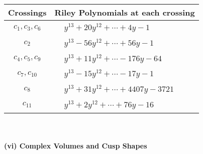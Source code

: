 \documentclass[1p]{elsarticle_modified}
\theoremstyle{definition}
\begin{document}
\begin{tabular}{m{50pt}|m{274pt}}
Crossings & \hspace{64pt}Riley Polynomials at each crossing \\
\hline $$\begin{aligned}c_{1},c_{3},c_{6}\end{aligned}$$&$\begin{aligned}
&y^{13}+20 y^{12}+\cdots+4 y-1
\end{aligned}$\\
\hline $$\begin{aligned}c_{2}\end{aligned}$$&$\begin{aligned}
&y^{13}-56 y^{12}+\cdots+56 y-1
\end{aligned}$\\
\hline $$\begin{aligned}c_{4},c_{5},c_{9}\end{aligned}$$&$\begin{aligned}
&y^{13}+11 y^{12}+\cdots-176 y-64
\end{aligned}$\\
\hline $$\begin{aligned}c_{7},c_{10}\end{aligned}$$&$\begin{aligned}
&y^{13}-15 y^{12}+\cdots-17 y-1
\end{aligned}$\\
\hline $$\begin{aligned}c_{8}\end{aligned}$$&$\begin{aligned}
&y^{13}+31 y^{12}+\cdots+4407 y-3721
\end{aligned}$\\
\hline $$\begin{aligned}c_{11}\end{aligned}$$&$\begin{aligned}
&y^{13}+2 y^{12}+\cdots+76 y-16
\end{aligned}$\\
\hline
\end{tabular}\\~\\
\newpage\flushleft \textbf{(vi) Complex Volumes and Cusp Shapes}
\end{document}
